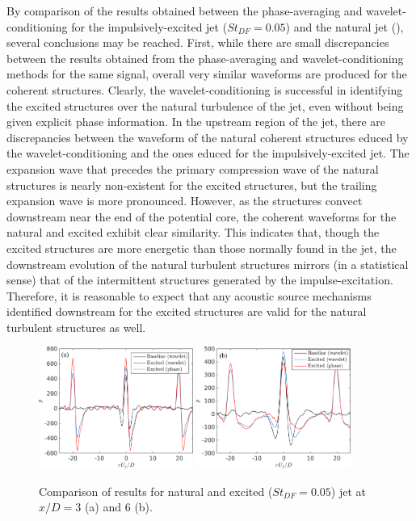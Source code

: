 By comparison of the results obtained between the phase-averaging and wavelet-conditioning for the impulsively-excited jet ($St_{DF} = 0.05$) and the natural jet (), several conclusions may be reached.
First, while there are small discrepancies between the results obtained from the phase-averaging and wavelet-conditioning methods for the same signal, overall very similar waveforms are produced for the coherent structures.
Clearly, the wavelet-conditioning is successful in identifying the excited structures over the natural turbulence of the jet, even without being given explicit phase information.
In the upstream region of the jet, there are discrepancies between the waveform of the natural coherent structures educed by the wavelet-conditioning and the ones educed for the impulsively-excited jet.
The expansion wave that precedes the primary compression wave of the natural structures is nearly non-existent for the excited structures, but the trailing expansion wave is more pronounced.
However, as the structures convect downstream near the end of the potential core, the coherent waveforms for the natural and excited exhibit clear similarity.
This indicates that, though the excited structures are more energetic than those normally found in the jet, the downstream evolution of the natural turbulent structures mirrors (in a statistical sense) that of the intermittent structures generated by the impulse-excitation.
Therefore, it is reasonable to expect that any acoustic source mechanisms identified downstream for the excited structures are valid for the natural turbulent structures as well.
\begin{figure}
	\centering
	\includegraphics[width=0.45\textwidth]{Figures/conditioning/Phase-wavelet_comparison_x3D_pa.png} %
	\includegraphics[width=0.45\textwidth]{Figures/conditioning/Phase-wavelet_comparison_x6D_pa.png} 
	\caption{Comparison of results for natural and excited ($St_{DF} = 0.05$) jet at $x/D = 3$ (a) and $6$ (b).}
	\label{fig:phase-wavelet_comparison}
\end{figure}

